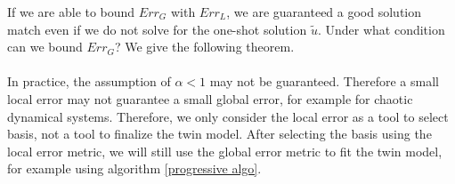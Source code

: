 \documentclass[a4paper,onecolumn]{article}
\theoremstyle{remark}
\newtheorem{theorem}{Theorem}
\begin{document}
\noindent If we are able to bound $Err_G$ with $Err_L$, we are guaranteed a good solution
match even if we do not solve for the one-shot solution $\tilde{u}$. Under what condition
can we bound $Err_G$? We give the following theorem.\\
\\

\noindent In practice, the assumption of $\alpha<1$ may not be
guaranteed. Therefore a small local error may not guarantee a small global error,
for example for chaotic dynamical systems.
Therefore, we only consider the local error as a tool to select basis, not a tool
to finalize the twin model. After selecting
the basis using the local error metric, 
we will still use the global error metric to fit the twin model, for example
using algorithm \ref{progressive algo}.\\
\end{document}
